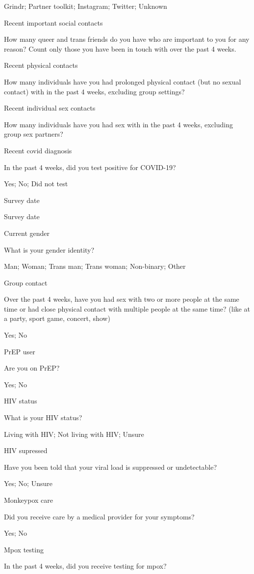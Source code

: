 \documentclass[
  letterpaper,
  DIV=11,
  numbers=noendperiod,
  oneside]{scrreprt}
\begin{document}
Grindr; Partner toolkit; Instagram; Twitter; Unknown

Recent important social contacts

How many queer and trans friends do you have who are important to you
for any reason? Count only those you have been in touch with over the
past 4 weeks.

Recent physical contacts

How many individuals have you had prolonged physical contact (but no
sexual contact) with in the past 4 weeks, excluding group settings?

Recent individual sex contacts

How many individuals have you had sex with in the past 4 weeks,
excluding group sex partners?

Recent covid diagnosis

In the past 4 weeks, did you test positive for COVID-19?

Yes; No; Did not test

Survey date

Survey date

Current gender

What is your gender identity?

Man; Woman; Trans man; Trans woman; Non-binary; Other

Group contact

Over the past 4 weeks, have you had sex with two or more people at the
same time or had close physical contact with multiple people at the same
time? (like at a party, sport game, concert, show)

Yes; No

PrEP user

Are you on PrEP?

Yes; No

HIV status

What is your HIV status?

Living with HIV; Not living with HIV; Unsure

HIV supressed

Have you been told that your viral load is suppressed or undetectable?

Yes; No; Unsure

Monkeypox care

Did you receive care by a medical provider for your symptoms?

Yes; No

Mpox testing

In the past 4 weeks, did you receive testing for mpox?
\end{document}
